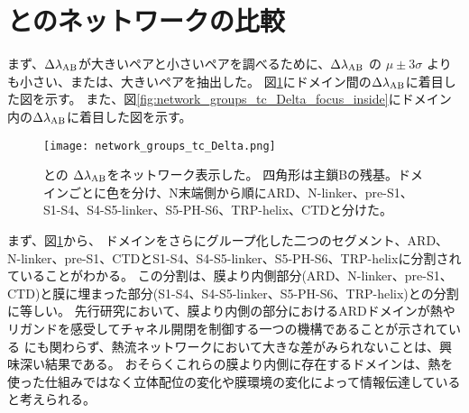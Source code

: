 \section{\openFortyTwo と\closeFortyTwo のネットワークの比較}
\label{sec:network_comparison}

まず、$\Delta \lambda_{\rm{AB}}$が大きいペアと小さいペアを調べるために、$\Delta \lambda_{\rm{AB}}$ の $\mu \pm 3 \sigma$ よりも小さい、または、大きいペアを抽出した。
図\ref{fig:network_groups_tc_Delta}にドメイン間の$\Delta \lambda_{\rm{AB}}$に着目した図を示す。
また、図\ref{fig:network_groups_tc_Delta_focus_inside}にドメイン内の$\Delta \lambda_{\rm{AB}}$に着目した図を示す。

\begin{figure}
  \centering
  \texttt{[image: network\_groups\_tc\_Delta.png]}
  \caption{\openFortyTwo と\closeFortyTwo の $\Delta \lambda_{\rm{AB}}$をネットワーク表示した。
            四角形は主鎖Bの残基。ドメインごとに色を分け、N末端側から順にARD、N-linker、pre-S1、S1-S4、S4-S5-linker、S5-PH-S6、TRP-helix、CTDと分けた。
            \autocite{pumroy_structural_2020}}
  \label{fig:network_groups_tc_Delta}
\end{figure}

まず、図\ref{fig:network_groups_tc_Delta}から、
ドメインをさらにグループ化した二つのセグメント、ARD、N-linker、pre-S1、CTDとS1-S4、S4-S5-linker、S5-PH-S6、TRP-helixに分割されていることがわかる。
この分割は、膜より内側部分(ARD、N-linker、pre-S1、CTD)と膜に埋まった部分(S1-S4、S4-S5-linker、S5-PH-S6、TRP-helix)との分割に等しい。
先行研究において、膜より内側の部分におけるARDドメインが熱やリガンドを感受してチャネル開閉を制御する一つの機構であることが示されている\autocite{phelps_differential_2010,phelps_insights_2007,shi_crystal_2013}
にも関わらず、熱流ネットワークにおいて大きな差がみられないことは、興味深い結果である。
おそらくこれらの膜より内側に存在するドメインは、熱を使った仕組みではなく立体配位の変化や膜環境の変化によって情報伝達していると考えられる。


